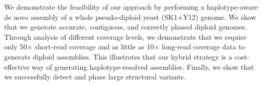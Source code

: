 
We demonstrate the feasibility of our approach by performing a haplotype-aware de novo assembly of a whole pseudo-diploid yeast (SK1+Y12) genome.
We show that we generate accurate, contiguous, and correctly phased diploid genomes.
Through analysis of different coverage levels, we demonstrate that we require only 50$\times$ short-read coverage and as little as 10$\times$ long-read coverage data to generate diploid assemblies.
This illustrates that our hybrid strategy is a cost-effective way of generating haplotype-resolved assemblies.
Finally, we show that we successfully detect and phase large structural variants.


